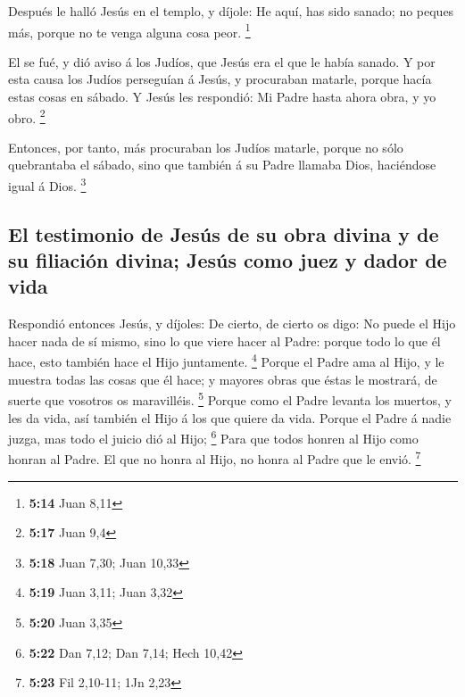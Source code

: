  Después le halló Jesús en el templo, y díjole: He aquí,
has sido sanado; no peques más, porque no te venga alguna cosa peor.
\footnote{\textbf{5:14} Juan 8,11}

 El se fué, y dió aviso á los Judíos, que Jesús era el
que le había sanado.  Y por esta causa los Judíos
perseguían á Jesús, y procuraban matarle, porque hacía estas cosas en
sábado.  Y Jesús les respondió: Mi Padre hasta ahora
obra, y yo obro. \footnote{\textbf{5:17} Juan 9,4}

 Entonces, por tanto, más procuraban los Judíos matarle,
porque no sólo quebrantaba el sábado, sino que también á su Padre
llamaba Dios, haciéndose igual á Dios. \footnote{\textbf{5:18} Juan
  7,30; Juan 10,33}

\hypertarget{el-testimonio-de-jesuxfas-de-su-obra-divina-y-de-su-filiaciuxf3n-divina-jesuxfas-como-juez-y-dador-de-vida}{%
\subsection{El testimonio de Jesús de su obra divina y de su filiación
divina; Jesús como juez y dador de
vida}\label{el-testimonio-de-jesuxfas-de-su-obra-divina-y-de-su-filiaciuxf3n-divina-jesuxfas-como-juez-y-dador-de-vida}}

 Respondió entonces Jesús, y díjoles: De cierto, de
cierto os digo: No puede el Hijo hacer nada de sí mismo, sino lo que
viere hacer al Padre: porque todo lo que él hace, esto también hace el
Hijo juntamente. \footnote{\textbf{5:19} Juan 3,11; Juan 3,32}
 Porque el Padre ama al Hijo, y le muestra todas las
cosas que él hace; y mayores obras que éstas le mostrará, de suerte que
vosotros os maravilléis. \footnote{\textbf{5:20} Juan 3,35}
 Porque como el Padre levanta los muertos, y les da vida,
así también el Hijo á los que quiere da vida.  Porque el
Padre á nadie juzga, mas todo el juicio dió al Hijo; \footnote{\textbf{5:22}
  Dan 7,12; Dan 7,14; Hech 10,42}  Para que todos honren
al Hijo como honran al Padre. El que no honra al Hijo, no honra al Padre
que le envió. \footnote{\textbf{5:23} Fil 2,10-11; 1Jn 2,23}

